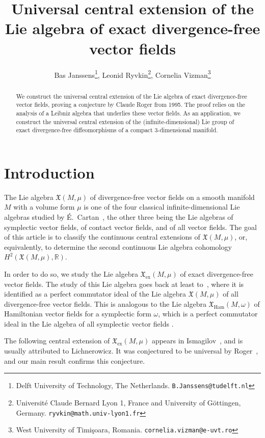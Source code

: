\documentclass{article}
\title{Universal central extension of the Lie algebra of exact divergence-free vector fields}
\author{
Bas Janssens\thanks{Delft University of Technology, The Netherlands. \texttt{B.Janssens@tudelft.nl}
},
Leonid Ryvkin\thanks{
Université Claude Bernard Lyon 1, France and University of Göttingen, Germany. \texttt{ryvkin@math.univ-lyon1.fr}
},
Cornelia Vizman\thanks{
West University of Timi\c soara, Romania. \texttt{cornelia.vizman@e-uvt.ro}
}
}
\newcommand{\ex}{\mathrm{ex}}
\newcommand{\fX}{\mathfrak{X}}
\newcommand{\R}{\mathbb{R}}
\theoremstyle{definition}
\begin{document}
\maketitle


\begin{abstract}
We construct the universal central extension of the Lie algebra of exact divergence-free vector fields, proving a conjecture by Claude Roger from 1995. The proof relies on the analysis of a Leibniz algebra that underlies these vector fields. 
As an application, we construct the universal central extension of the (infinite-dimensional) Lie group of exact divergence-free diffeomorphisms of a compact 3-dimensional manifold.
\end{abstract}

\tableofcontents


\newpage


\section{Introduction}

The Lie algebra $\fX(M,\mu)$ of divergence-free vector fields on a smooth manifold $M$ with a volume form $\mu$ is one of the four 
classical infinite-dimensional Lie algebras studied by \'{E}.\ Cartan~\cite{Cartan1909, SingerSternberg1965}, the other three being the Lie algebras of symplectic vector fields, of contact vector fields, and of all vector fields.
The goal of this article is to classify the continuous central extensions of $\fX(M,\mu)$, or, equivalently, to determine the second continuous Lie algebra cohomology $H^2(\fX(M,\mu),\R)$.

In order to do so, we study the Lie algebra $\fX_{\ex}(M,\mu)$ of exact divergence-free vector fields. 
The study of this Lie algebra goes back at least to~\cite{Lichnerowicz1974}, where it is identified as a perfect commutator ideal of the Lie algebra 
$\mathfrak X(M,\mu)$ of all divergence-free vector fields. This is analogous to the Lie algebra $\fX_{\mathrm{Ham}}(M,\omega)$ of Hamiltonian vector fields for a symplectic form $\omega$, which is a perfect commutator ideal in the Lie algebra of all symplectic vector fields \cite{ALDM74}.

The following central extension of $\fX_{\ex}(M,\mu)$ appears in Ismagilov~\cite{Ismagilov1980}, and is usually attributed to Lichnerowicz. 
It was conjectured to be universal by Roger~\cite{Roger1995}, and our main result confirms this conjecture.
\end{document}
